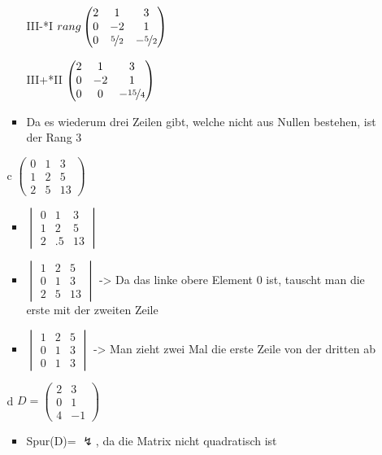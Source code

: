 \documentclass{article}
\begin{document}
\begin{itemize}
\begin{itemize}
\begin{itemize}
				\item[III-\nicefrac{7}{2}*I]{$rang \begin{pmatrix} 2 & 1 & 3 \\ 0 & -2 & 1 \\ 0 & \nicefrac{5}{2} & -\nicefrac{5}{2} \end{pmatrix}$}
				\item[III+\nicefrac{5}{4}*II]{$\begin{pmatrix} 2 & 1 & 3 \\ 0 & -2 & 1 \\ 0 & 0 & -\nicefrac{15}{4} \end{pmatrix}$}
				\item{Da es wiederum drei Zeilen gibt, welche nicht aus Nullen bestehen, ist der Rang 3}
			\end{itemize}
			\item[c]{$\begin{pmatrix} 0 & 1 & 3 \\ 1 & 2 & 5 \\ 2 & 5 & 13 \end{pmatrix}$}
			\begin{itemize}
				\item{$\begin{vmatrix} 0 & 1 & 3 \\ 1 & 2 & 5 \\ 2 &.5 & 13 \end{vmatrix}$}
				\item{$\begin{vmatrix} 1 & 2 & 5 \\ 0 & 1 & 3 \\ 2 & 5 & 13 \end{vmatrix}$ -> Da das linke obere Element 0 ist, tauscht man die erste mit der zweiten Zeile}
				\item{$\begin{vmatrix} 1 & 2 & 5 \\ 0 & 1 & 3 \\ 0 & 1 & 3 \end{vmatrix}$ -> Man zieht zwei Mal die erste Zeile von der dritten ab}
			\end{itemize}
			\item[d]{$D=\begin{pmatrix} 2 & 3 \\ 0 & 1 \\ 4 & -1 \end{pmatrix}$}
			\begin{itemize}
				\item{Spur(D)= $\lightning$, da die Matrix nicht quadratisch ist}

\end{itemize}
\end{itemize}
\end{itemize}
\end{document}
